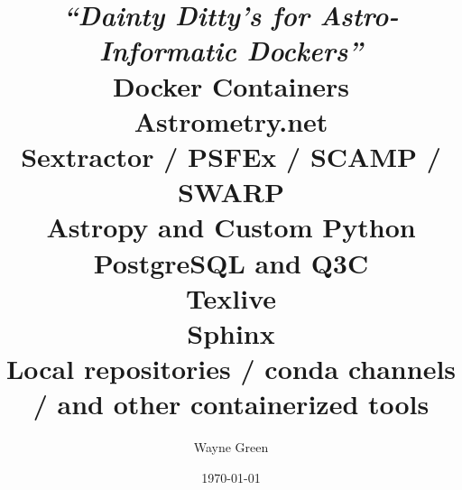 \documentclass[letter,11pt,oneside]{article}
\begin{document}


\BgThispage


\title{\vspace{-1.1cm}
  {\huge \emph{{\color{darkgreen}``Dainty Ditty's for Astro-Informatic Dockers''}}} \\
  {\large Docker Containers} \\
  {\large Astrometry.net} \\
  {\large Sextractor / PSFEx / SCAMP / SWARP} \\
  {\large Astropy and Custom Python} \\
  {\large PostgreSQL and Q3C} \\
  {\large Texlive} \\
  {\large Sphinx} \\
  {\small Local repositories / conda channels / and other containerized tools}}
\author{\vspace{-0.5cm} Wayne Green}
\date{\vspace{-0.5cm} \today}
\maketitle
\end{document}

